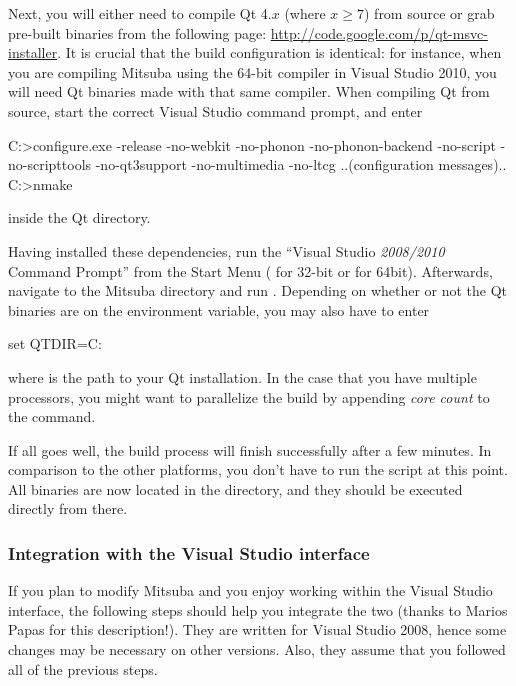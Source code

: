 Next, you will either need to compile Qt 4.$x$ (where $x\ge 7$) from source or grab pre-built binaries from the following page: \url{http://code.google.com/p/qt-msvc-installer}. It is crucial that the build configuration is identical: for instance, when you are compiling Mitsuba using the 64-bit compiler in Visual Studio 2010, you will need Qt binaries made with that same compiler. When compiling Qt from source,
start the correct Visual Studio command prompt, and enter
\begin{shell}
C:\Qt>configure.exe -release -no-webkit -no-phonon -no-phonon-backend -no-script
      -no-scripttools -no-qt3support -no-multimedia -no-ltcg
..(configuration messages)..
C:\Qt>nmake
\end{shell}
inside the Qt directory.

Having installed these dependencies, run the ``Visual Studio \emph{2008/2010} Command 
Prompt'' from the Start Menu ( for 32-bit or  for 64bit). Afterwards,
navigate to the Mitsuba directory and run . 
Depending on whether or not the Qt binaries are on the 
environment variable, you may also have to enter
\begin{shell}
set QTDIR=C:\Qt
\end{shell}
where  is the path to your Qt installation.
In the case that you have multiple processors, you might want to parallelize the build by appending \emph{core count} to the  command.

If all goes well, the build process will finish successfully after a few
minutes. In comparison to the other platforms, you don't have to run the  script at this point. 
All binaries are now located in the  directory, and they should be executed directly from there.
\subsubsection{Integration with the Visual Studio interface}
If you plan to modify Mitsuba and you enjoy working within the Visual
Studio interface, the following steps should help you integrate the two
(thanks to Marios Papas for this description!). They are written for Visual Studio 2008,
hence some changes may be necessary on other versions. Also, they assume
that you followed all of the previous steps.


